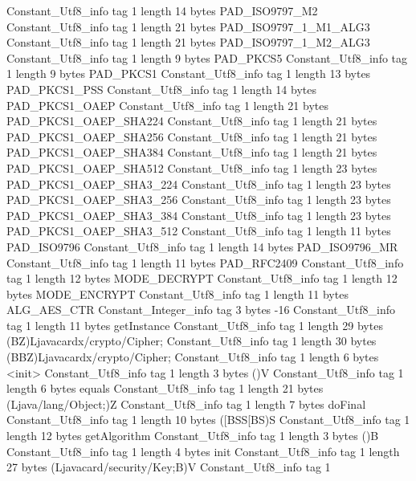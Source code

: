 {{{		}
		Constant_Utf8_info {
			tag	1
			length	14
			bytes	PAD_ISO9797_M2
		}
		Constant_Utf8_info {
			tag	1
			length	21
			bytes	PAD_ISO9797_1_M1_ALG3
		}
		Constant_Utf8_info {
			tag	1
			length	21
			bytes	PAD_ISO9797_1_M2_ALG3
		}
		Constant_Utf8_info {
			tag	1
			length	9
			bytes	PAD_PKCS5
		}
		Constant_Utf8_info {
			tag	1
			length	9
			bytes	PAD_PKCS1
		}
		Constant_Utf8_info {
			tag	1
			length	13
			bytes	PAD_PKCS1_PSS
		}
		Constant_Utf8_info {
			tag	1
			length	14
			bytes	PAD_PKCS1_OAEP
		}
		Constant_Utf8_info {
			tag	1
			length	21
			bytes	PAD_PKCS1_OAEP_SHA224
		}
		Constant_Utf8_info {
			tag	1
			length	21
			bytes	PAD_PKCS1_OAEP_SHA256
		}
		Constant_Utf8_info {
			tag	1
			length	21
			bytes	PAD_PKCS1_OAEP_SHA384
		}
		Constant_Utf8_info {
			tag	1
			length	21
			bytes	PAD_PKCS1_OAEP_SHA512
		}
		Constant_Utf8_info {
			tag	1
			length	23
			bytes	PAD_PKCS1_OAEP_SHA3_224
		}
		Constant_Utf8_info {
			tag	1
			length	23
			bytes	PAD_PKCS1_OAEP_SHA3_256
		}
		Constant_Utf8_info {
			tag	1
			length	23
			bytes	PAD_PKCS1_OAEP_SHA3_384
		}
		Constant_Utf8_info {
			tag	1
			length	23
			bytes	PAD_PKCS1_OAEP_SHA3_512
		}
		Constant_Utf8_info {
			tag	1
			length	11
			bytes	PAD_ISO9796
		}
		Constant_Utf8_info {
			tag	1
			length	14
			bytes	PAD_ISO9796_MR
		}
		Constant_Utf8_info {
			tag	1
			length	11
			bytes	PAD_RFC2409
		}
		Constant_Utf8_info {
			tag	1
			length	12
			bytes	MODE_DECRYPT
		}
		Constant_Utf8_info {
			tag	1
			length	12
			bytes	MODE_ENCRYPT
		}
		Constant_Utf8_info {
			tag	1
			length	11
			bytes	ALG_AES_CTR
		}
		Constant_Integer_info {
			tag	3
			bytes	-16
		}
		Constant_Utf8_info {
			tag	1
			length	11
			bytes	getInstance
		}
		Constant_Utf8_info {
			tag	1
			length	29
			bytes	(BZ)Ljavacardx/crypto/Cipher;
		}
		Constant_Utf8_info {
			tag	1
			length	30
			bytes	(BBZ)Ljavacardx/crypto/Cipher;
		}
		Constant_Utf8_info {
			tag	1
			length	6
			bytes	<init>
		}
		Constant_Utf8_info {
			tag	1
			length	3
			bytes	()V
		}
		Constant_Utf8_info {
			tag	1
			length	6
			bytes	equals
		}
		Constant_Utf8_info {
			tag	1
			length	21
			bytes	(Ljava/lang/Object;)Z
		}
		Constant_Utf8_info {
			tag	1
			length	7
			bytes	doFinal
		}
		Constant_Utf8_info {
			tag	1
			length	10
			bytes	([BSS[BS)S
		}
		Constant_Utf8_info {
			tag	1
			length	12
			bytes	getAlgorithm
		}
		Constant_Utf8_info {
			tag	1
			length	3
			bytes	()B
		}
		Constant_Utf8_info {
			tag	1
			length	4
			bytes	init
		}
		Constant_Utf8_info {
			tag	1
			length	27
			bytes	(Ljavacard/security/Key;B)V
		}
		Constant_Utf8_info {
			tag	1
}}}

